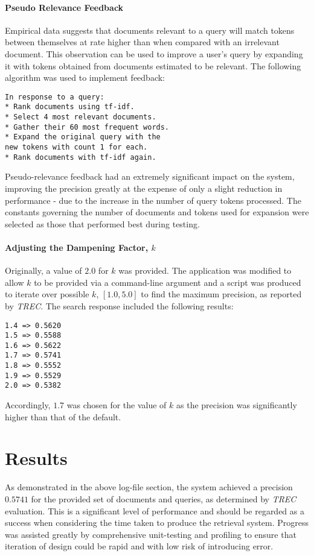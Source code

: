 \documentclass[10pt, a4paper, twocolumn]{article}   	%
\begin{document}
\paragraph{Pseudo Relevance Feedback}
Empirical data suggests that documents relevant to a query will match tokens between themselves at rate higher than when compared with an irrelevant document. This observation can be used to improve a user's query by expanding it with tokens obtained from documents estimated to be relevant.
The following algorithm was used to implement feedback:
\begin{verbatim}
In response to a query:
* Rank documents using tf-idf.
* Select 4 most relevant documents.
* Gather their 60 most frequent words.
* Expand the original query with the
new tokens with count 1 for each.
* Rank documents with tf-idf again.
\end{verbatim}
Pseudo-relevance feedback had an extremely significant impact on the system, improving the precision greatly at the expense of only a slight reduction in performance - due to the increase in the number of query tokens processed. The constants governing the number of documents and tokens used for expansion were selected as those that performed best during testing.

\paragraph{Adjusting the Dampening Factor, $k$}
Originally, a value of $2.0$ for $k$ was provided. The application was modified to allow $k$ to be provided via a command-line argument and a script was produced to iterate over possible $k$, $[1.0, 5.0]$ to find the maximum precision, as reported by \emph{TREC}.
The search response included the following results:
\begin{verbatim}
1.4 => 0.5620
1.5 => 0.5588
1.6 => 0.5622
1.7 => 0.5741
1.8 => 0.5552
1.9 => 0.5529
2.0 => 0.5382
\end{verbatim}
Accordingly, $1.7$ was chosen for the value of $k$ as the precision was significantly higher than that of the default.
\section{Results}
As demonstrated in the above log-file section, the system achieved a precision $0.5741$ for the provided set of documents and queries, as determined by \emph{TREC} evaluation.
This is a significant level of performance and should be regarded as a success when considering the time taken to produce the retrieval system. Progress was assisted greatly by comprehensive unit-testing and profiling to ensure that iteration of design could be rapid and with low risk of introducing error.
\end{document}
